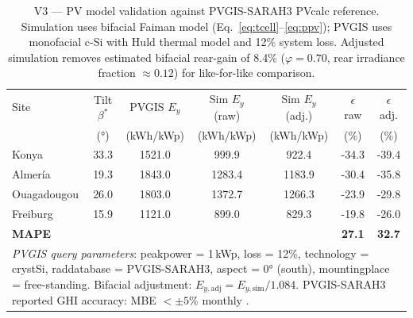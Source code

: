 \begin{table}[H]
\small
\caption{V3 — PV model validation against PVGIS-SARAH3 PVcalc reference.
  Simulation uses bifacial Faiman model (Eq.~\ref{eq:tcell}--\ref{eq:ppv});
  PVGIS uses monofacial c-Si with Huld thermal model and 12\% system loss.
  Adjusted simulation removes estimated bifacial rear-gain of 8.4\%
  ($\varphi=0.70$, rear irradiance fraction $\approx 0.12$) for
  like-for-like comparison.}
\label{tab:v3_pv_validation}
\centering
\begin{tabular}{lcccccc}
\toprule
Site & Tilt $\beta^*$ & PVGIS $E_y$ & Sim $E_y$ (raw) & Sim $E_y$ (adj.) & $\epsilon$ raw & $\epsilon$ adj. \\
 & (°) & (kWh/kWp) & (kWh/kWp) & (kWh/kWp) & (\%) & (\%) \\
\midrule
Konya & 33.3 & 1521.0 & 999.9 & 922.4 & -34.3 & -39.4 \\
Almer\'{i}a & 19.3 & 1843.0 & 1283.4 & 1183.9 & -30.4 & -35.8 \\
Ouagadougou & 26.0 & 1803.0 & 1372.7 & 1266.3 & -23.9 & -29.8 \\
Freiburg & 15.9 & 1121.0 & 899.0 & 829.3 & -19.8 & -26.0 \\
\midrule
\multicolumn{5}{l}{\textbf{MAPE}} & \textbf{27.1} & \textbf{32.7} \\
\midrule
\multicolumn{7}{p{14cm}}{\footnotesize\textit{PVGIS query parameters}: peakpower = 1\,kWp, loss = 12\%, technology = crystSi, raddatabase = PVGIS-SARAH3, aspect = 0° (south), mountingplace = free-standing. Bifacial adjustment: $E_{y,\text{adj}} = E_{y,\text{sim}} / 1.084$. PVGIS-SARAH3 reported GHI accuracy: MBE $<\pm5\%$ monthly \citep{huld2012, urraca2017}.} \\
\bottomrule
\end{tabular}
\end{table}
